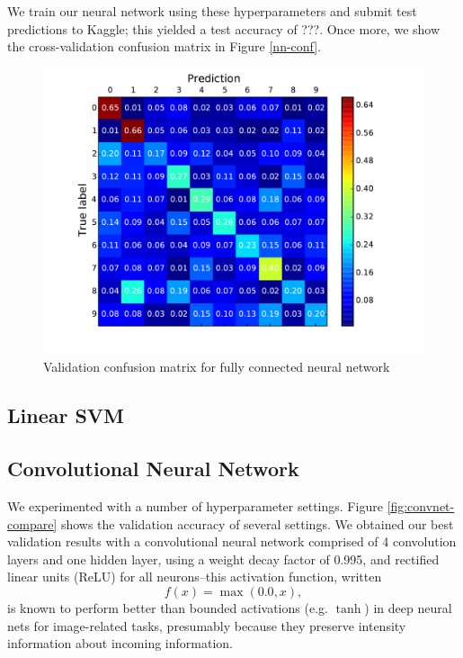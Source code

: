 \documentclass{acm_proc_article-sp}
\begin{document}
We train our neural network using these hyperparameters and submit test predictions to Kaggle; this yielded a test accuracy of ???. Once more, we show the cross-validation confusion matrix in Figure \ref{nn-conf}.

\begin{figure}[h!]
	\centering
	\includegraphics[width=\linewidth]{neuralnet_confusion}
  	\caption{Validation confusion matrix for fully connected neural network}
  	\label{fig:nn-conf}
\end{figure}

\subsection{Linear SVM}


\subsection{Convolutional Neural Network}
We experimented with a number of hyperparameter settings. Figure \ref{fig:convnet-compare} shows the validation accuracy of several settings. We obtained our best validation results with a convolutional neural network comprised of 4 convolution layers and one hidden layer, using a weight decay factor of 0.995, and rectified linear units (ReLU)  for all neurons--this activation function, written $$f(x) = \max(0.0, x),$$ is known to perform better than bounded activations (e.g. $\tanh$) in deep neural nets for image-related tasks, presumably because they preserve intensity information about incoming information.\cite{Nair}
\end{document}
